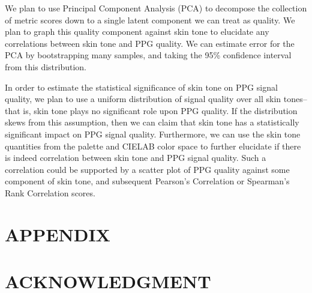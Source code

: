 \documentclass[letterpaper, 10 pt, conference]{ieeeconf}  %
\begin{document}
We plan to use Principal Component Analysis (PCA) to decompose the collection of metric scores down to a single latent component we can treat as quality. We plan to graph this quality component against skin tone to elucidate any correlations between skin tone and PPG quality. We can estimate error for the PCA by bootstrapping many samples, and taking the 95\% confidence interval from this distribution.  

In order to estimate the statistical significance of skin tone on PPG signal quality, we plan to use a uniform distribution of signal quality over all skin tones– that is, skin tone plays no significant role upon PPG quality. If the distribution skews from this assumption, then we can claim that skin tone has a statistically significant impact on PPG signal quality. Furthermore, we can use the skin tone quantities from the palette and CIELAB color space to further elucidate if there is indeed correlation between skin tone and PPG signal quality. Such a correlation could be supported by a scatter plot of PPG quality against some component of skin tone, and subsequent Pearson’s Correlation or Spearman’s Rank Correlation scores. 

\addtolength{\textheight}{-12cm}   %







\section*{APPENDIX}


\section*{ACKNOWLEDGMENT}







\end{document}
